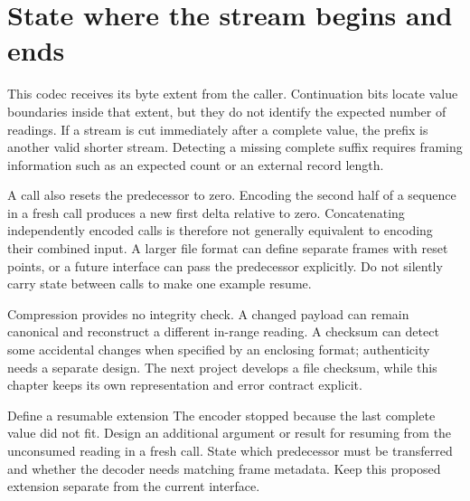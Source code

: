 \section{State where the stream begins and ends}
This codec receives its byte extent from the caller. Continuation bits locate value
boundaries inside that extent, but they do not identify the expected number of readings.
If a stream is cut immediately after a complete value, the prefix is another valid
shorter stream. Detecting a missing complete suffix requires framing information such
as an expected count or an external record length.

A call also resets the predecessor to zero. Encoding the second half of a sequence in
a fresh call produces a new first delta relative to zero. Concatenating independently
encoded calls is therefore not generally equivalent to encoding their combined input.
A larger file format can define separate frames with reset points, or a future interface
can pass the predecessor explicitly. Do not silently carry state between calls to make
one example resume.

Compression provides no integrity check. A changed payload can remain canonical and
reconstruct a different in-range reading. A checksum can detect some accidental changes
when specified by an enclosing format; authenticity needs a separate design. The next
project develops a file checksum, while this chapter keeps its own representation and
error contract explicit.

\begin{MARSExercise}{Define a resumable extension}
The encoder stopped because the last complete value did not fit. Design an additional
argument or result for resuming from the unconsumed reading in a fresh call. State
which predecessor must be transferred and whether the decoder needs matching frame
metadata. Keep this proposed extension separate from the current interface.
\end{MARSExercise}
